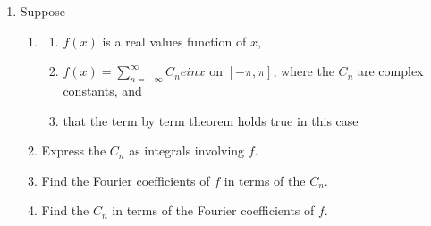 \documentclass{article}
\begin{document}
\begin{enumerate}
\item Suppose
\begin{enumerate}
\item[] {}

\begin{enumerate}
\item $f(x)$ is a real values function of $x$,
\item $\displaystyle f(x) = \sum_{n=-\infty}^\infty C_ne{inx}$ on $[-\pi, \pi ]$, where the $C_n$ are complex constants, and
\item that the term by term theorem holds true in this case
\end{enumerate}


\item Express the $C_n$ as integrals involving $f$.
\item Find the Fourier coefficients of $f$ in terms of the $C_n$.
\item Find the $C_n$ in terms of the Fourier coefficients of $f$.
\end{enumerate}
\end{enumerate}
\end{document}
